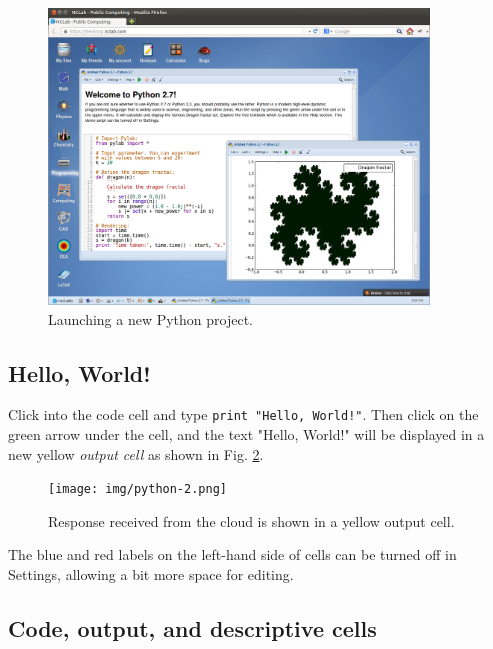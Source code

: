 \documentclass[article,A4,12pt]{llncs}
\begin{document}
\begin{figure}[!ht]
\begin{center}
\includegraphics[width=0.9\textwidth]{img/python.png}
\end{center}
\vspace{-2mm}
\caption{Launching a new Python project.}
\label{fig:python}
\end{figure}


\subsection{Hello, World!}

Click into the code cell and type {\tt print "Hello, World!"}.
Then click on the green arrow under the cell, and the text 
"Hello, World!" will be displayed 
in a new yellow {\em output cell} as shown in Fig. \ref{fig:python-2}.
\newpage
\begin{figure}[!ht]
\begin{center}
\texttt{[image: img/python-2.png]}
\end{center}
\vspace{-2mm}
\caption{Response received from the cloud is shown in a yellow output cell.}
\label{fig:python-2}
\end{figure}
\noindent
The blue and red labels on the left-hand side of cells can be turned
off in Settings, allowing a bit more space for editing.

\subsection{Code, output, and descriptive cells}
\end{document}
